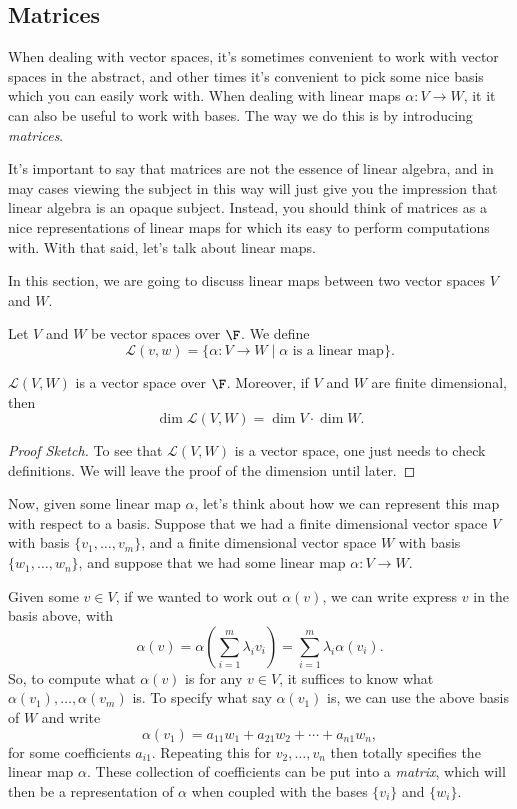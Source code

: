 \documentclass[a4paper]{scrartcl}
\begin{document}
\subsection{Matrices}

When dealing with vector spaces, it's sometimes convenient to work with vector spaces in the abstract, and other times it's convenient to pick some nice basis which you can easily work with.
When dealing with linear maps $\alpha: V \rightarrow W$, it it can also be useful to work with bases. The way we do this is by introducing \emph{matrices}.

It's important to say that matrices are not the essence of linear algebra, and in may cases viewing the subject in this way will just give you the impression that linear algebra is an opaque subject. Instead, you should think of matrices as a nice representations of linear maps for which its easy to perform computations with.
With that said, let's talk about linear maps.

In this section, we are going to discuss linear maps between two vector spaces $V$ and $W$.

\begin{definition}
    Let $V$ and $W$ be vector spaces over $\F$. We define
    $$
    \mathcal{L}(v, w) = \{\alpha: V \rightarrow W \mid \alpha \text{ is a linear map}\}.
    $$
\end{definition}

\begin{proposition}
    $\mathcal{L}(V, W)$ is a vector space over $\F$. Moreover, if $V$ and $W$ are finite dimensional, then
    $$
    \dim \mathcal{L}(V, W) = \dim V \cdot \dim W.
    $$
\end{proposition}
\begin{proof}[Proof Sketch]    
    To see that $\mathcal{L}(V, W)$ is a vector space, one just needs to check definitions. We will leave the proof of the dimension until later.
\end{proof}

Now, given some linear map $\alpha$, let's think about how we can represent this map with respect to a basis.
Suppose that we had a finite dimensional vector space $V$ with basis $\{v_1, \dots, v_m\}$, and a finite dimensional vector space $W$ with basis $\{w_1, \dots, w_n\}$, and suppose that we had some linear map $\alpha : V \rightarrow W$.

Given some $v \in V$, if we wanted to work out $\alpha(v)$, we can write express $v$ in the basis above, with
$$
\alpha(v) = \alpha\left(\sum_{i = 1}^m \lambda_i v_i\right) = \sum_{i = 1}^m \lambda_i \alpha(v_i).
$$
So, to compute what $\alpha(v)$ is for any $v \in V$, it suffices to know what $\alpha(v_1), \dots, \alpha(v_m)$ is. To specify what say $\alpha(v_1)$ is, we can use the above basis of $W$ and write
$$
\alpha(v_1) = a_{11} w_1 + a_{21} w_2 + \cdots + a_{n1} w_n,
$$
for some coefficients $a_{i1}$. Repeating this for $v_2, \dots, v_n$ then totally specifies the linear map $\alpha$.
These collection of coefficients can be put into a \emph{matrix}, which will then be a representation of $\alpha$ when coupled with the bases $\{v_i\}$ and $\{w_i\}$.
\end{document}
